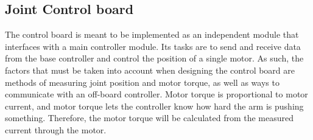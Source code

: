 
\subsection{Joint Control board}
\label{sec:control_board}
The control board is meant to be implemented as an independent module that interfaces with a main controller module. Its tasks are to send and receive data from the base controller and control the position of a single motor. As such, the factors that must be taken into account when designing the control board are methods of measuring joint position and motor torque, as well as ways to communicate with an off-board controller. Motor torque is proportional to motor current, and motor torque lets the controller know how hard the arm is pushing something. Therefore, the motor torque will be calculated from the measured current through the motor.
